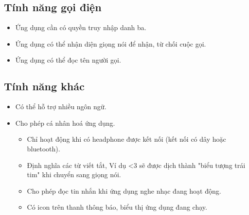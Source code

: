\documentclass[a4paper,12pt,oneside]{article}
\begin{document}
	\subsection{Tính năng gọi điện}
	\begin{itemize}
		\item Ứng dụng cần có quyền truy nhập danh ba.
		\item Ứng dụng có thể nhận diện giọng nói để nhận, từ chối cuộc gọi.
		\item Ứng dụng có thể đọc tên người gọi.
	\end{itemize}
\subsection{Tính năng khác}
\begin{itemize}
	\item Có thể hỗ trợ nhiều ngôn ngữ.
	\item Cho phép cá nhân hoá ứng dụng.
	\begin{itemize}
		\item Chỉ hoạt động khi có headphone được kết nối (kết nối có dây hoặc bluetooth).
		\item Định nghĩa các từ viết tắt, Ví dụ <3 sẽ được dịch thành "biểu tượng trái tim" khi chuyển sang giọng nói.
		\item Cho phép đọc tin nhắn khi ứng dụng nghe nhạc đang hoạt động.
		\item Có icon trên thanh thông báo, biểu thị ứng dụng đang chạy.
	\end{itemize}
\end{itemize}
\end{document}
